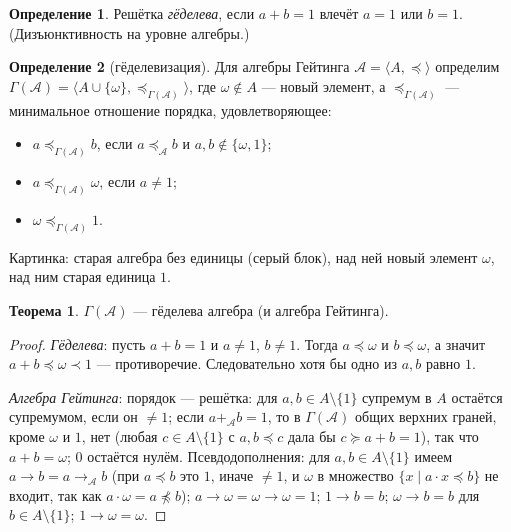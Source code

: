 \documentclass[11pt,a4paper]{article}
\theoremstyle{definition}
\newtheorem*{dfn}{Определение}
\newtheorem*{thm}{Теорема}
\begin{document}
\begin{dfn}
Решётка \emph{гёделева}, если $a+b=1$ влечёт $a=1$ или $b=1$. (Дизъюнктивность на уровне алгебры.)
\end{dfn}
\begin{dfn}[гёделевизация]
Для алгебры Гейтинга $\mathcal{A}=\langle A,\preceq\rangle$ определим $\Gamma(\mathcal{A})=\langle A\cup\{\omega\},\preceq_{\Gamma(\mathcal{A})}\rangle$, где $\omega\notin A$ --- новый элемент, а $\preceq_{\Gamma(\mathcal{A})}$ --- минимальное отношение порядка, удовлетворяющее:
\begin{itemize}
\item $a\preceq_{\Gamma(\mathcal{A})}b$, если $a\preceq_{\mathcal{A}}b$ и $a,b\notin\{\omega,1\}$;
\item $a\preceq_{\Gamma(\mathcal{A})}\omega$, если $a\ne1$;
\item $\omega\preceq_{\Gamma(\mathcal{A})}1$.
\end{itemize}
\end{dfn}
Картинка: старая алгебра без единицы (серый блок), над ней новый элемент $\omega$, над ним старая единица $1$.
\begin{center}
\end{center}

\begin{thm}
$\Gamma(\mathcal{A})$ --- гёделева алгебра (и алгебра Гейтинга).
\end{thm}
\begin{proof}
\emph{Гёделева}: пусть $a+b=1$ и $a\ne1$, $b\ne1$. Тогда $a\preceq\omega$ и $b\preceq\omega$, а значит $a+b\preceq\omega\prec1$ --- противоречие. Следовательно хотя бы одно из $a,b$ равно $1$.

\emph{Алгебра Гейтинга}: порядок --- решётка: для $a,b\in A\setminus\{1\}$ супремум в $A$ остаётся супремумом, если он $\ne1$; если $a+_{\mathcal{A}}b=1$, то в $\Gamma(\mathcal{A})$ общих верхних граней, кроме $\omega$ и $1$, нет (любая $c\in A\setminus\{1\}$ с $a,b\preceq c$ дала бы $c\succeq a+b=1$), так что $a+b=\omega$; $0$ остаётся нулём. Псевдодополнения: для $a,b\in A\setminus\{1\}$ имеем $a\to b=a\to_{\mathcal{A}}b$ (при $a\preceq b$ это $1$, иначе $\ne1$, и $\omega$ в множество $\{x\mid a\cdot x\preceq b\}$ не входит, так как $a\cdot\omega=a\not\preceq b$); $a\to\omega=\omega\to\omega=1$; $1\to b=b$; $\omega\to b=b$ для $b\in A\setminus\{1\}$; $1\to\omega=\omega$.
\end{proof}
\end{document}
